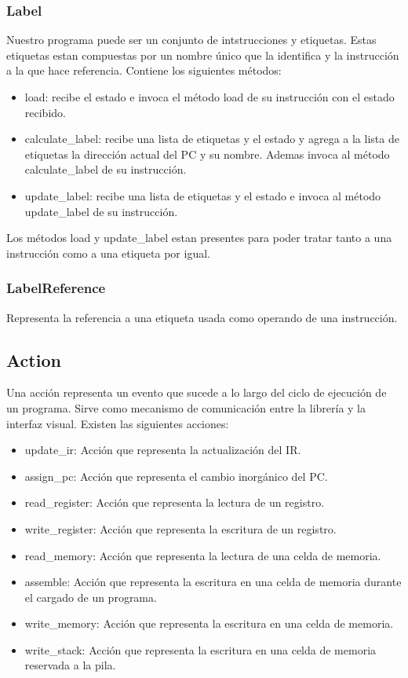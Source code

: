 \subsubsection{Label}
Nuestro programa puede ser un conjunto de intstrucciones y etiquetas. Estas etiquetas estan compuestas por un nombre único que la identifica y la instrucción a la que hace referencia.
Contiene los siguientes métodos:

\begin{itemize}
	\item load: recibe el estado e invoca el método load de su instrucción con el estado recibido.
	\item calculate\_label: recibe una lista de etiquetas y el estado y agrega a la lista de etiquetas la dirección actual del PC y su nombre. Ademas invoca al método calculate\_label de su instrucción.
	\item update\_label: recibe una lista de etiquetas y el estado e invoca al método update\_label de su instrucción.
\end{itemize}
Los métodos load y update\_label estan presentes para poder tratar tanto a una instrucción como a una etiqueta por igual.

\subsubsection{LabelReference}
Representa la referencia a una etiqueta usada como operando de una instrucción.

\subsection{Action}
Una acción representa un evento que sucede a lo largo del ciclo de ejecución de un programa. Sirve como mecanismo de comunicación entre la librería y la interfaz visual.
Existen las siguientes acciones:

\begin{itemize}
	\item update\_ir: Acción que representa la actualización del IR.
	\item assign\_pc: Acción que representa el cambio inorgánico del PC. 
	\item read\_register: Acción que representa la lectura de un registro.
	\item write\_register: Acción que representa la escritura de un registro.
	\item read\_memory: Acción que representa la lectura de una celda de memoria.
	\item assemble: Acción que representa la escritura en una celda de memoria durante el cargado de un programa.
	\item write\_memory: Acción que representa la escritura en una celda de memoria.
	\item write\_stack: Acción que representa la escritura en una celda de memoria reservada a la pila.
\end{itemize}

